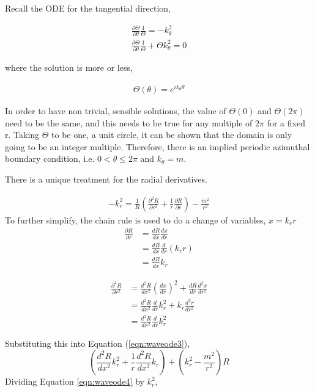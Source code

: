 Recall the ODE for the tangential direction, 

\begin{align*}
    \frac{\partial \Theta}{\partial \theta} \frac{1}{\Theta} = - k_{\theta}^2\\
    \frac{\partial \Theta}{\partial \theta} \frac{1}{\Theta} + \Theta k_{\theta}^2 = 0 
\end{align*}

where the solution is more or less,

\begin{align*}
    \Theta(\theta) = e^{i k_{\theta} \theta}
\end{align*}

In order to have non trivial, sensible solutions, the value of $\Theta(0)$ and
$\Theta(2\pi)$ need to be the same, and this needs to be true for any multiple 
of $2\pi$ for a fixed r. Taking $\Theta$ to be one, a unit circle, it can be shown that the domain
is only going to be an integer multiple. Therefore, there is an implied periodic
azimuthal boundary condition, i.e. $0<\theta\leq 2 \pi$ and $k_{\theta}=m$. 

There is a unique treatment for the radial derivatives.


\begin{align*}
    -k_r^2 =\frac{1}{R}
    \left(      
    \frac{\partial^2 R}{\partial r^2 } +
    \frac{1}{r}\frac{\partial R}{\partial r}  
\right) -
    \frac{m^2}{r^2} 
\end{align*}
To further simplify, the chain rule is used to do a change of variables, $x = k_r r$
\begin{align*}
    \frac{\partial R}{\partial r} &= \frac{dR}{dx}\frac{dx}{dr}\\
    &=
    \frac{dR}{dx}\frac{d}{dr}\left( k_r r \right) \\
    &=
    \frac{dR}{dx} k_r 
\end{align*} 


\begin{align*}
    \frac{\partial^2 R}{\partial r^2} &= \frac{d^2R}{dx^2}\left(\frac{dx}{dr}\right)^2 + 
    \frac{dR}{dr}\frac{d^2x}{dr^2}\\
    &=
    \frac{d^2R}{dx^2}\frac{d}{dr} k_r^2 + k_r \frac{d^2r}{dr^2}\\
    &=
    \frac{d^2R}{dx^2}\frac{d}{dr} k_r^2
\end{align*} 

Substituting this into Equation (\ref{eqn:waveode3}),
\begin{equation}
    \left(\frac{d^2R}{dx^2}k_r^2 +
    \frac{1}{r}\frac{d^2R}{dx^2}k_r\right) +
    \left(k_r^2 - \frac{m^2}{r^2}\right)R
    \label{eqn:waveode4}
\end{equation}
Dividing Equation \ref{eqn:waveode4} by $k_r^2$,

